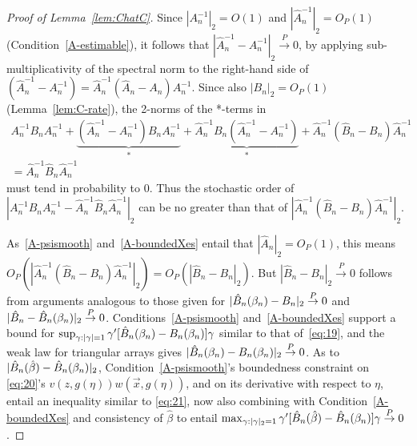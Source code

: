 \documentclass{article}
\theoremstyle{remark}
\begin{document}
\begin{proof}[Proof of Lemma~\ref{lem:ChatC}]
Since $|{A}_{n}^{-1}|_{2}=O(1)$ and $|\hat{A}_{n}^{-1}|_{2}= O_{P}(1)$ (Condition~\ref{A-estimable}), it follows that $|\hat{A}_{n}^{-1} - A_{n}^{-1}|_{2} \stackrel{P}{\rightarrow} 0$, by applying sub-multiplicativity of the spectral norm to the right-hand side of 
$(\hat{A}_{n}^{-1} - A_{n}^{-1}) = \hat{A}_{n}^{-1} (\hat{A}_{n} - A_{n}) {A}_{n}^{-1}$.  Since also $|B_{n}|_{2} = O_{P}(1)$ (Lemma~\ref{lem:C-rate}), 
the 2-norms of the *-terms in 
\begin{multline*}
  A_{n}^{-1}B_{n}A_{n}^{-1}  + \underbrace{(\hat{A}_{n}^{-1} - A_{n}^{-1})B_{n}A_{n}^{-1}}_{*} + \underbrace{\hat{A}_{n}^{-1}B_{n}(\hat{A}_{n}^{-1} - A_{n}^{-1})}_{*}   + \hat{A}_{n}^{-1}(\hat{B}_{n} - B_{n})\hat{A}_{n}^{-1}  \\[-2ex]
=  \hat{A}_{n}^{-1}\hat{B}_{n}\hat{A}_{n}^{-1}
\end{multline*}
must tend in probability to 0.  Thus the stochastic order of $|A_{n}^{-1}B_{n}A_{n}^{-1} - \hat{A}_{n}^{-1}\hat{B}_{n}\hat{A}_{n}^{-1}|_{2}$ can be no greater than that of $|\hat{A}_{n}^{-1}(\hat{B}_{n} - B_{n}) \hat{A}_{n}^{-1}|_{2}$.  

As~\ref{A-psismooth} and~\ref{A-boundedXes}%
 entail that $|\hat{A}_{n}|_{2} = O_{P}(1)$, this means $O_{P}(|\hat{A}_{n}^{-1}(\hat{B}_{n} - B_{n}) \hat{A}_{n}^{-1}|_{2}) = O_{P}(|\hat{B}_{n} - B_{n}|_{2})$. But $|\hat{B}_{n} - B_{n}|_{2} \stackrel{P}{\rightarrow} 0$ follows from arguments analogous to those given for %
$|\hat{B}_{n}(\beta_{n }) - B_{n}|_{2} \stackrel{P}{\rightarrow} 0$ and $|\hat{B}_{n} - \hat{B}_{n}(\beta_{n })|_{2} \stackrel{P}{\rightarrow} 0$.   Conditions~\ref{A-psismooth}  and~\ref{A-boundedXes} support a bound for $\sup_{\gamma: |\gamma|=1}\gamma'[\hat{B}_{n}(\beta_{n }) - B_{n}(\beta_{n })]\gamma$ similar to that of~\eqref{eq:19}, and the weak law for triangular arrays gives $|\hat{B}_{n}(\beta_{n }) - B_{n}(\beta_{n })|_{2} \stackrel{P}{\rightarrow} 0$.   As to $|\hat{B}_{n}(\hat\beta) - \hat{B}_{n}(\beta_{n })|_{2}$, Condition~\ref{A-psismooth}'s boundedness constraint on \eqref{eq:20}'s $v(z, g(\eta))w(\vec{x}, g(\eta))$, and on its derivative with respect to $\eta$, entail an inequality similar to \eqref{eq:21}, now also combining with Condition~\ref{A-boundedXes}%
 and consistency of $\hat\beta$ to entail $\max_{\gamma: |\gamma|_{2}=1} \gamma'[\hat{B}_{n}(\hat\beta) - \hat{B}_{n}(\beta_{n }) ]\gamma \stackrel{P}{\rightarrow} 0$.
\end{proof}
\end{document}
